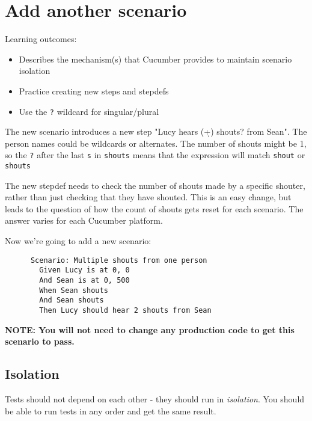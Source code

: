 \chapter*{Add another scenario}

\ifnotes

    Learning outcomes:
    
    \begin{itemize}
        \item Describes the mechanism(s) that Cucumber provides to maintain scenario isolation
        \item Practice creating new steps and stepdefs
        \item Use the \texttt{?} wildcard for singular/plural
    \end{itemize}

    The new scenario introduces a new step "Lucy hears (\d+) shouts? from Sean". The person names could be wildcards or alternates. The number of shouts might be 1, so the \texttt{?} after the last \texttt{s} in \texttt{shouts} means that the expression will match \texttt{shout} or \texttt{shouts}
    
    The new stepdef needs to check the number of shouts made by a specific shouter, rather than just checking that they have shouted. This is an easy change, but leads to the question of how the count of shouts gets reset for each scenario. The answer varies for each Cucumber platform.

\fi 

\ifcontent 
    Now we're going to add a new scenario:
    
    \begin{verbatim}
      Scenario: Multiple shouts from one person
        Given Lucy is at 0, 0
        And Sean is at 0, 500
        When Sean shouts
        And Sean shouts
        Then Lucy should hear 2 shouts from Sean
    \end{verbatim}
    
    \textbf{NOTE: You will not need to change any production code to get this scenario to pass.}
    
    \section*{Isolation}
    
    Tests should not depend on each other - they should run in \emph{isolation}. You should be able to run tests in any order and get the same result. 
    
